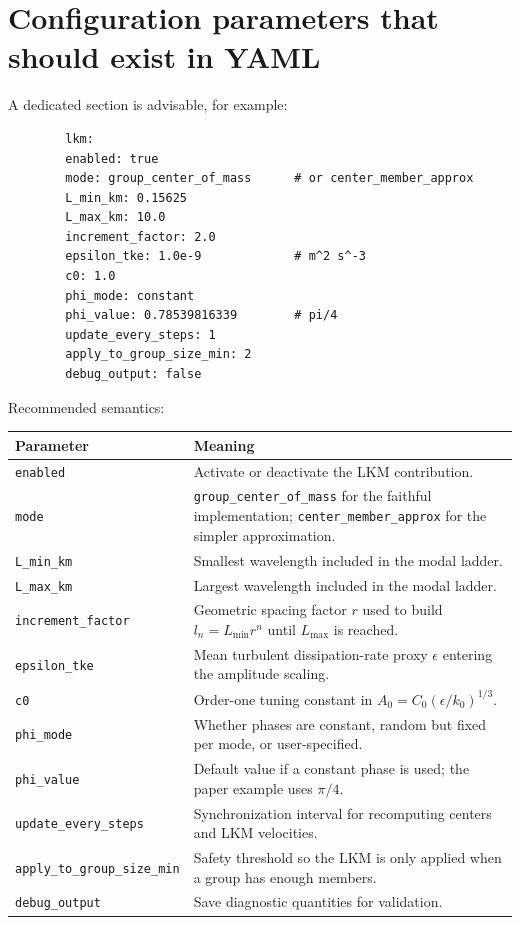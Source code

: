 \documentclass[11pt,a4paper]{article}
\begin{document}
	
	\section{Configuration parameters that should exist in YAML}
	
	A dedicated section is advisable, for example:
	
	\begin{verbatim}
		lkm:
		enabled: true
		mode: group_center_of_mass      # or center_member_approx
		L_min_km: 0.15625
		L_max_km: 10.0
		increment_factor: 2.0
		epsilon_tke: 1.0e-9             # m^2 s^-3
		c0: 1.0
		phi_mode: constant
		phi_value: 0.78539816339        # pi/4
		update_every_steps: 1
		apply_to_group_size_min: 2
		debug_output: false
	\end{verbatim}
	
	Recommended semantics:
	\begin{longtable}{p{}p{}}
		\toprule
		\textbf{Parameter} & \textbf{Meaning} \\
		\midrule
		\texttt{enabled} & Activate or deactivate the LKM contribution. \\
		\texttt{mode} & \texttt{group\_center\_of\_mass} for the faithful implementation; \texttt{center\_member\_approx} for the simpler approximation. \\
		\texttt{L\_min\_km} & Smallest wavelength included in the modal ladder. \\
		\texttt{L\_max\_km} & Largest wavelength included in the modal ladder. \\
		\texttt{increment\_factor} & Geometric spacing factor $r$ used to build $l_n = L_{\min} r^n$ until $L_{\max}$ is reached. \\
		\texttt{epsilon\_tke} & Mean turbulent dissipation-rate proxy $\epsilon$ entering the amplitude scaling. \\
		\texttt{c0} & Order-one tuning constant in $A_0 = C_0(\epsilon/k_0)^{1/3}$. \\
		\texttt{phi\_mode} & Whether phases are constant, random but fixed per mode, or user-specified. \\
		\texttt{phi\_value} & Default value if a constant phase is used; the paper example uses $\pi/4$. \\
		\texttt{update\_every\_steps} & Synchronization interval for recomputing centers and LKM velocities. \\
		\texttt{apply\_to\_group\_size\_min} & Safety threshold so the LKM is only applied when a group has enough members. \\
		\texttt{debug\_output} & Save diagnostic quantities for validation. \\
		\bottomrule
	\end{longtable}
	
\end{document}
